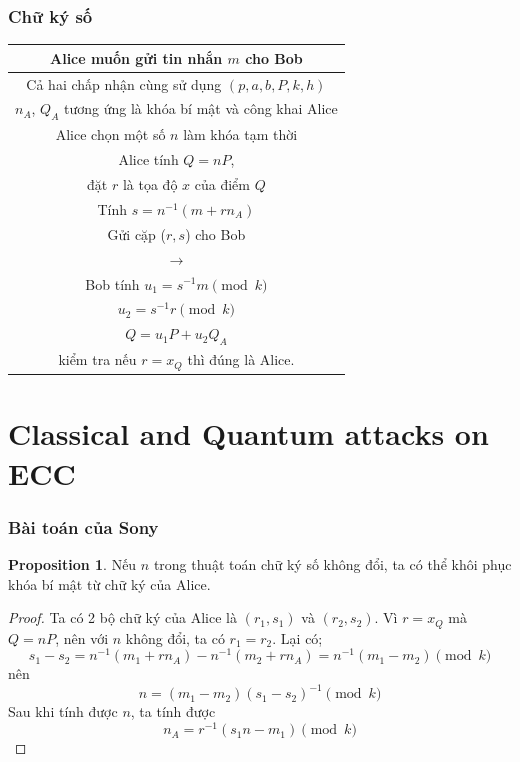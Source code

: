 \documentclass [xcolor=svgnames, t] {beamer}
\theoremstyle{definition}
\newtheorem{proposition}[theorem]{Proposition}
\begin{document}
\begin{frame}
    \frametitle{Chữ ký số}
    \begin{center}
        \fontsize{10pt}{12pt}

        \begin{tabular}{|c|}
            \hline
            Alice muốn gửi tin nhắn $m$ cho Bob                      \\
            \hline
            Cả hai chấp nhận cùng sử dụng $(p, a, b, P, k, h)$       \\
            \hline
            $n_A$, $Q_A$ tương ứng là khóa bí mật và công khai Alice \\
            \hline
            \hline
            Alice chọn một số $n$ làm khóa tạm thời                  \\
            \hline
            Alice tính $Q = nP$,                                     \\
            đặt $r$ là tọa độ $x$ của điểm $Q$                       \\
            Tính $s = n^{-1}(m+ rn_A)$                               \\
            Gửi cặp ($r, s$) cho Bob                                 \\
            $\longrightarrow$                                        \\
            \hline
            Bob tính $u_1 = s^{-1}m \pmod{k}$                        \\
            $u_2 = s^{-1}r \pmod{k}$                                 \\
            $Q = u_1P + u_2Q_A$                                      \\
            kiểm tra nếu $r = x_Q$ thì đúng là Alice.                \\
            \hline
        \end{tabular}

    \end{center}


\end{frame}
\section{Classical and Quantum attacks on ECC}
\begin{frame}
    \frametitle{Bài toán của Sony \cite{fildes2011iphone}}
    \begin{proposition}
        \label{pro:4.1}
        Nếu $n$ trong thuật toán chữ ký số không đổi, ta có thể khôi phục khóa bí mật từ chữ ký của Alice.
    \end{proposition}
    \begin{proof}
        Ta có 2 bộ chữ ký của Alice là $(r_1, s_1)$ và $(r_2, s_2)$.
        Vì $r = x_Q$ mà $Q = nP$, nên với $n$ không đổi, ta có $r_1 = r_2$.
        Lại có;
        $$ s_1 - s_2 = n^{-1}(m_1+rn_A) - n^{-1}(m_2+rn_A) = n^{-1}(m_1-m_2) \pmod{k}$$
        nên $$ n = (m_1 - m_2)(s_1 - s_2)^{-1} \pmod{k}$$
        Sau khi tính được $n$, ta tính được $$n_A = r^{-1}(s_1n-m_1) \pmod{k}$$
    \end{proof}
\end{frame}
\end{document}
